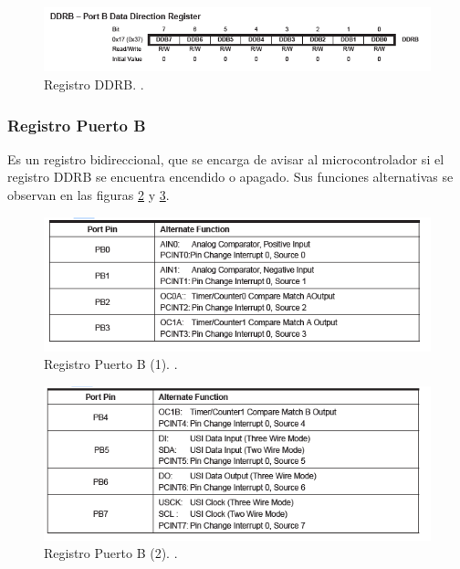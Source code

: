 \documentclass[12pt,letterpaper]{article}     %
\begin{document}
\begin{figure}[H]
    \centering
    \includegraphics[width=1.0\textwidth]{imagenes/3.PNG}
    \caption{Registro DDRB. \cite{Microchip}.}
    \label{F:DDRB}
    \end{figure}
    
\subsubsection{Registro Puerto B}
Es un registro bidireccional, que se encarga de avisar al microcontrolador si el registro DDRB se encuentra encendido o apagado. Sus funciones alternativas se observan en las figuras \ref{F:B1} y \ref{F:B2}.

\begin{figure}[H]
    \centering
    \includegraphics[width=1.0\textwidth]{imagenes/4.PNG}
    \caption{Registro Puerto B (1). \cite{Microchip}.}
    \label{F:B1}
    \end{figure}

\begin{figure}[H]
    \centering
    \includegraphics[width=1.0\textwidth]{imagenes/5.PNG}
    \caption{Registro Puerto B (2). \cite{Microchip}.}
    \label{F:B2}
    \end{figure}
    
\end{document}
